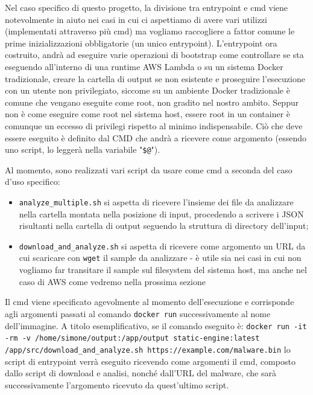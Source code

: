 Nel caso specifico di questo progetto, la divisione tra entrypoint e cmd viene notevolmente in aiuto nei casi in cui ci aspettiamo di avere vari utilizzi (implementati attraverso più cmd) ma vogliamo raccogliere a fattor comune le prime inizializzazioni obbligatorie (un unico entrypoint).
L'entrypoint ora costruito, andrà ad eseguire varie operazioni di bootstrap come controllare se sta eseguendo all'interno di una runtime AWS Lambda o su un sistema Docker tradizionale, creare la cartella di output se non esistente e proseguire l'esecuzione con un utente non privilegiato, siccome su un ambiente Docker tradizionale è comune che vengano eseguite come root, non gradito nel nostro ambito. Seppur non è come eseguire come root nel sistema host, essere root in un container è comunque un eccesso di privilegi rispetto al minimo indispensabile.
Ciò che deve essere eseguito è definito dal CMD che andrà a ricevere come argomento (essendo uno script, lo leggerà nella variabile "\texttt{\$@}").

Al momento, sono realizzati vari script da usare come cmd a seconda del caso d'uso specifico:
\begin{itemize}
    \item \texttt{analyze\_multiple.sh} si aspetta di ricevere l'insieme dei file da analizzare nella cartella montata nella posizione di input, procedendo a scrivere i JSON risultanti nella cartella di output seguendo la struttura di directory dell'input;
    \item \texttt{download\_and\_analyze.sh} si aspetta di ricevere come argomento un URL da cui scaricare con \texttt{wget} il sample da analizzare - è utile sia nei casi in cui non vogliamo far transitare il sample sul filesystem del sistema host, ma anche nel caso di AWS come vedremo nella prossima sezione
\end{itemize}

Il cmd viene specificato agevolmente al momento dell'esecuzione e corrisponde agli argomenti passati al comando \texttt{docker run} successivamente al nome dell'immagine. A titolo esemplificativo, se il comando eseguito è:
\texttt{docker run -it -rm -v /home/simone/output:/app/output static-engine:latest} \\ \texttt{/app/src/download\_and\_analyze.sh https://example.com/malware.bin}
lo script di entrypoint verrà eseguito ricevendo come argomenti il cmd, composto dallo script di download e analisi, nonché dall'URL del malware, che sarà successivamente l'argomento ricevuto da quest'ultimo script.

